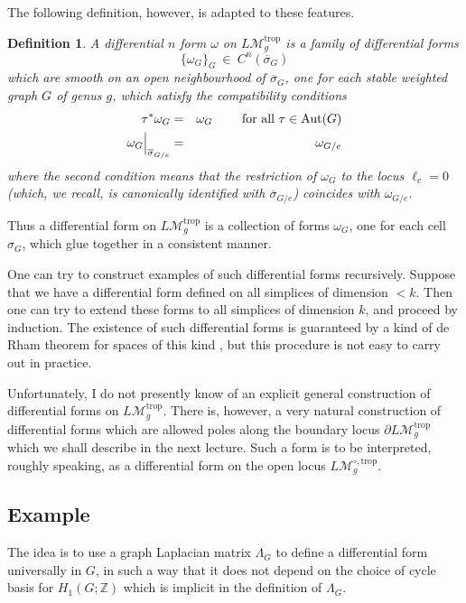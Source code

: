 \documentclass[12pt]{amsart}
\newcommand{\ZZ}{{\mathbb Z}}
\theoremstyle{plain}
\newtheorem{defn}[thm]{Definition}
\newcommand{\LM}{L\mathcal{M}}
\newcommand{\trop}{\mathrm{trop}}
\newcommand{\0}{\color{blue}{\mathsf{0}}}
\begin{document}
The following definition, however,  is adapted to these features.

\begin{defn} A differential $n$ form $\omega$ on $\LM_g^{\trop}$ is a family of differential forms 
\[ \{\omega_G\}_G  \ \in \  C^{n} ( \overline{\sigma}_G)  \]
which are smooth on an open neighbourhood of  $\overline{\sigma}_G$, one for each stable weighted  graph $G$ of genus $g$, which satisfy the compatibility conditions
\begin{eqnarray} 
\tau^* \omega_G & =&  \omega_G \qquad \hbox{ for all } \tau \in \mathrm{Aut}(G) \nonumber \\ 
\omega_G\Big|_{\overline{\sigma}_{G/e}} & =&  \omega_{G/e}    \nonumber 
\end{eqnarray}
where the second condition means that the restriction of $\omega_G$ to the locus $\ell_e=0$ (which, we recall,  is canonically identified with $\overline{\sigma}_{G/e}$)  coincides with $\omega_{G/e}$.
\end{defn} 

Thus a differential form on $\LM_g^{\trop}$ is a collection of forms $\omega_G$, one for each cell $\sigma_G$, which glue together in a consistent manner.  



One can try to construct examples of such differential forms  recursively. Suppose that we have a differential form defined on all simplices of dimension $<k$. Then one can try to extend these forms to all simplices of dimension $k$, and proceed by induction. The existence  of such differential forms is  guaranteed by a kind of de Rham theorem for spaces of this kind \cite{brown2023bordifications}, but this procedure is not easy to carry out in practice. 



Unfortunately, I do not presently know of an explicit general construction of differential forms  on $\LM_g^{\trop}$. There is, however, a very natural construction of differential forms which are allowed poles along the boundary locus $\partial \LM^{\trop}_g$ which we shall describe in the next lecture. 
Such a form is to be interpreted, roughly speaking, as a  differential form on  the open locus $\LM_g^{\circ, \trop}$. 



\subsection{Example} \label{sect:exampleCanintW3}
The idea  is to use a  graph Laplacian matrix $\Lambda_G$ to define a differential form universally in $G$, in such a way that it does not depend on the choice of cycle basis for $H_1(G;\ZZ)$ which is implicit in the definition of  $\Lambda_G$. 
\end{document}
